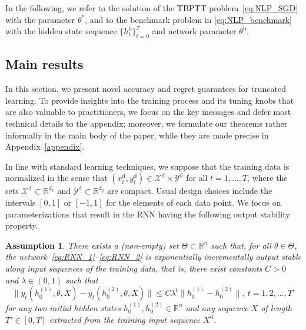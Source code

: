 \documentclass{article} %
\newtheorem{ass}{Assumption}
\begin{document}
In the following, we refer to the solution of the TBPTT problem~\eqref{eq:NLP_SGD} with the parameter $\theta^*$, and to the benchmark problem in \eqref{eq:NLP_benchmark} with the hidden state sequence $\{h^\mathrm{b}_t\}^T_{t=0}$ and network parameter $\theta^\mathrm{b}$.


\subsection{Main results}\label{sec:results_main}
In this section, we present novel accuracy and regret guarantees for truncated learning. To provide insights into the training process and its tuning knobs that are also valuable to practitioners, we focus on the key messages and defer most technical details to the appendix; moreover, we formulate our theorems rather informally in the main body of the paper, while they are made precise in Appendix~\ref{appendix}.

In line with standard learning techniques, we suppose that the training data is normalized in the sense that $({x}_{t}^\mathrm{d},{y}_{t}^\mathrm{d})\in\mathcal{X}^\mathrm{d}\times\mathcal{Y}^\mathrm{d}$ for all $t=1,...,T$, where the sets $\mathcal{X}^\mathrm{d}\subset\mathbb{R}^{d_x}$ and $\mathcal{Y}^\mathrm{d}\subset\mathbb{R}^{d_y}$ are compact. Usual design choices include the intervals $[0,1]$ or $[-1,1]$ for the elements of each data point.
We focus on parameterizations that result in the RNN having the following output stability property.

\begin{ass}\label{ass:output_stability}
	There exists a (non-empty) set $\Theta\subset\mathbb{R}^{n}$ such that, for all $\theta\in\Theta$, the network~\eqref{eq:RNN_1}--\eqref{eq:RNN_2} is exponentially incrementally output stable along input sequences of the training data, that is, there exist constants $C>0$ and $\lambda\in(0,1)$ such that
	\begin{equation}
		\|y_t(h_0^{(1)},{\theta},X)-y_t(h_0^{(2)},{\theta},X)\| \leq 	C\lambda^t\|h_0^{(1)}-h_0^{(2)}\|,\ t=1,2,...,T' \label{eq:output_stability}
	\end{equation}
	for any two initial hidden states $h^{(1)}_{0},h^{(2)}_{0}\in\mathbb{R}^n$ and any sequence $X$ of length $T'\in[0,T]$ extracted from the training input sequence $X^\mathrm{d}$.
\end{ass}
\end{document}
